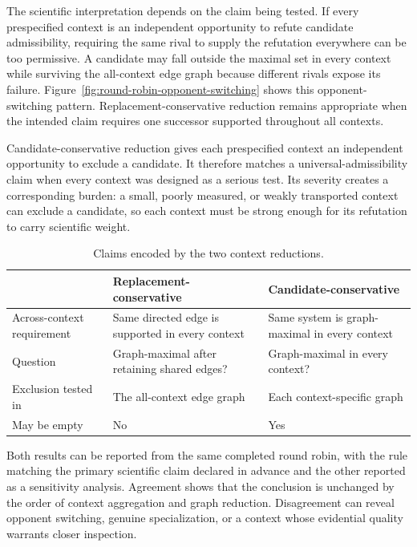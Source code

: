 \documentclass[11pt]{article}
\theoremstyle{remark}
\begin{document}
The scientific interpretation depends on the claim being
tested. If every prespecified context is an independent opportunity to refute
candidate admissibility, requiring the same rival to supply the refutation
everywhere can be too permissive. A candidate may fall outside the maximal set
in every context while surviving the all-context edge graph because different
rivals expose its failure. Figure~\ref{fig:round-robin-opponent-switching}
shows this opponent-switching pattern. Replacement-conservative reduction
remains appropriate when the intended claim requires one successor supported
throughout all contexts.

Candidate-conservative reduction gives each prespecified context an
independent opportunity to exclude a candidate. It therefore matches a
universal-admissibility claim when every context was designed as a serious
test. Its severity creates a corresponding burden: a small, poorly measured,
or weakly transported context can exclude a candidate, so each context must
be strong enough for its refutation to carry scientific weight.

\begin{table}[H]
\centering
\caption{Claims encoded by the two context reductions.}
\label{tab:round-robin-rules}
\small
\begin{tabularx}{\textwidth}{@{}>{\raggedright\arraybackslash}p{}>{\raggedright\arraybackslash}X>{\raggedright\arraybackslash}X@{}}
\toprule
 & Replacement-conservative & Candidate-conservative \\
\midrule
Across-context requirement & Same directed edge is supported in every context & Same system is graph-maximal in every context \\
Question & Graph-maximal after retaining shared edges? & Graph-maximal in every context? \\
Exclusion tested in & The all-context edge graph & Each context-specific graph \\
May be empty & No & Yes \\
\bottomrule
\end{tabularx}
\end{table}

Both results can be reported from the same completed round robin, with the
rule matching the primary scientific claim declared in advance and the other
reported as a sensitivity analysis. Agreement shows that the conclusion is
unchanged by the order of context aggregation and graph reduction.
Disagreement can reveal opponent switching, genuine specialization, or a
context whose evidential quality warrants closer inspection.
\end{document}
